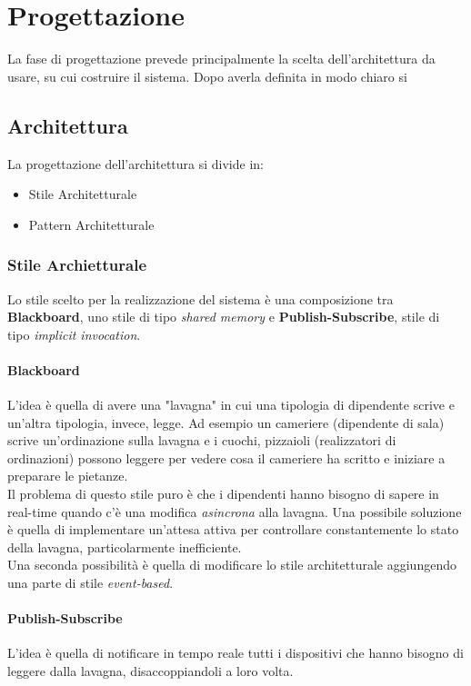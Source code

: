 \chapter{Progettazione}
La fase di progettazione prevede principalmente la scelta dell'architettura da usare, su cui costruire il sistema. Dopo averla definita in modo chiaro si 

\section{Architettura}
La progettazione dell'architettura si divide in:
\begin{itemize}
	\item Stile Architetturale
	\item Pattern Architetturale
\end{itemize}

\subsection{Stile Archietturale}
Lo stile scelto per la realizzazione del sistema è una composizione tra \textbf{Blackboard}, uno stile di tipo \textit{shared memory} e \textbf{Publish-Subscribe}, stile di tipo \textit{implicit invocation}.

\subsubsection{Blackboard}
L'idea è quella di avere una "lavagna" in cui una tipologia di dipendente scrive e un'altra tipologia, invece, legge.
Ad esempio un cameriere (dipendente di sala) scrive un'ordinazione sulla lavagna e i cuochi, pizzaioli (realizzatori di ordinazioni) possono leggere per vedere cosa il cameriere ha scritto e iniziare a preparare le pietanze.
\\Il problema di questo stile puro è che i dipendenti hanno bisogno di sapere in real-time quando c'è una modifica \textit{asincrona} alla lavagna. Una possibile soluzione è quella di implementare un'attesa attiva per controllare constantemente lo stato della lavagna, particolarmente inefficiente. 
\\Una seconda possibilità è quella di modificare lo stile architetturale aggiungendo una parte di stile \textit{event-based}.

\subsubsection{Publish-Subscribe}
L'idea è quella di notificare in tempo reale tutti i dispositivi che hanno bisogno di leggere dalla lavagna, disaccoppiandoli a loro volta. 

